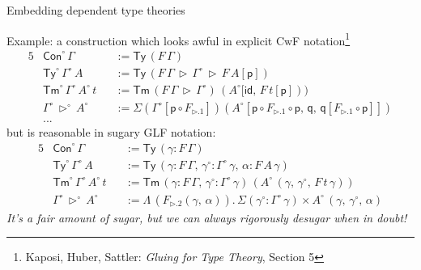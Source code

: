 \documentclass[dvipsnames,aspectratio=169]{beamer}
\newcommand{\ms}[1]{\mathsf{#1}}
\newcommand{\bs}[1]{\boldsymbol{#1}}
\newcommand{\id}{\mathsf{id}}
\newcommand{\Con}{\mathsf{Con}}
\newcommand{\Tm}{\mathsf{Tm}}
\newcommand{\Ty}{\mathsf{Ty}}
\newcommand{\Y}{\mathsf{Y}}
\newcommand{\ext}{\triangleright}
\begin{document}

\begin{frame}{Embedding dependent type theories}

Example: a construction which looks awful in explicit CwF notation\footnote{Kaposi, Huber, Sattler: \emph{Gluing for Type Theory}, Section 5}
{\small
\begin{alignat*}{5}
  &\Con^{\circ}\,\Gamma && := \Ty\,(F\,\Gamma)\\
  &\Ty^{\circ}\,\Gamma^{\circ}\,A && := \Ty\,(F\,\Gamma\,\ext\,\Gamma^{\circ}\,\ext\,F\,A[\ms{p}])\\
  &\Tm^{\circ}\,\Gamma^{\circ}\,A^{\circ}\,t && := \Tm\,(F\,\Gamma\,\ext\,\Gamma^{\circ})\,(A^{\circ}[\id,\,F\,t[\ms{p}]))\\
  & \Gamma^{\circ}\,\ext^{\circ}\,A^{\circ} && := \Sigma(\Gamma^{\circ}[\ms{p}\circ F_{\ext.1}])(A^{\circ}[\ms{p} \circ F_{\ext.1} \circ \ms{p},\,\ms{q},\,\ms{q}[F_{\ext.1} \circ \ms{p}]])\\
  & ... &&
\end{alignat*}
\vspace{-1.0em}
{\normalsize but is reasonable in sugary GLF notation:}
\begin{alignat*}{5}
  &\Con^{\circ}\,\Gamma && := \Ty\,(\gamma : F\,\Gamma)\\
  &\Ty^{\circ}\,\Gamma^{\circ}\,A && := \Ty\,(\gamma : F\,\Gamma,\,\gamma^{\circ} : \Gamma^{\circ}\,\gamma,\,\alpha : F\,A\,\gamma)\\
  &\Tm^{\circ}\,\Gamma^{\circ}\,A^{\circ}\,t && := \Tm\,(\gamma : F\,\Gamma,\,\gamma^{\circ} : \Gamma^{\circ}\,\gamma)\,(A^{\circ}\,(\gamma,\,\gamma^{\circ},\,F\,t\,\gamma))\\
  & \Gamma^{\circ}\,\ext^{\circ}\,A^{\circ} &&:= \Lambda\,(F_{\ext.2}(\gamma,\,\alpha)).\, \Sigma(\gamma^{\circ} : \Gamma^{\circ}\,\gamma) \times A^{\circ}\,(\gamma,\,\gamma^{\circ},\,\alpha)
\end{alignat*}
}
\emph{It's a fair amount of sugar, but we can always rigorously desugar when in doubt!}

\end{frame}
\end{document}
